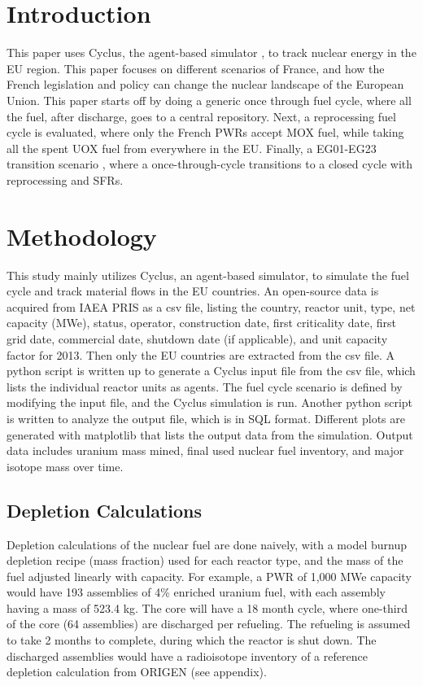 \section{Introduction}
This paper uses Cyclus, the agent-based simulator \cite{huff_fundamental_2016}, to track
nuclear energy in the EU region. This paper focuses on different scenarios of France,
and how the French legislation and policy can change the nuclear landscape of the European
Union. This paper starts off by doing a generic once through fuel cycle, where all the fuel,
after discharge, goes to a central repository. Next, a reprocessing fuel cycle is evaluated,
where only the French \gls{PWR}s accept \gls{MOX} fuel, while taking all the spent \gls{UOX}
fuel from everywhere in the EU. Finally, a EG01-EG23 transition scenario \cite{wigeland_nuclear_2014},
where a once-through-cycle transitions to a closed cycle with reprocessing and \gls{SFR}s. 

\section{Methodology}
This study mainly utilizes Cyclus, an agent-based simulator, to simulate the fuel cycle
and track material flows in the EU countries. An open-source data is acquired from \gls{IAEA}
\gls{PRIS} as a csv file, listing the country, reactor unit, type, net capacity (MWe), status,
operator, construction date, first criticality date, first grid date, commercial date, shutdown
date (if applicable), and unit capacity factor for 2013. Then only the EU countries are extracted
from the csv file. A python script is written up to generate a Cyclus input file from the csv file,
which lists the individual reactor units as agents. The fuel cycle scenario is defined by modifying
the input file, and the Cyclus simulation is run. Another python script is written to analyze the 
output file, which is in SQL format. Different plots are generated with matplotlib that lists the 
output data from the simulation. Output data includes uranium mass mined, final used nuclear fuel
inventory, and major isotope mass over time.


\subsection{Depletion Calculations}
Depletion calculations of the nuclear fuel are done
naively, with a model burnup depletion recipe (mass fraction) used
for each reactor type, and the mass of the fuel 
adjusted linearly with capacity. For example, a PWR of
1,000 MWe capacity would have 193 assemblies of 4\% enriched
uranium fuel, with each assembly having a mass of 523.4 kg.
The core will have a 18 month cycle, where one-third of the 
core (64 assemblies) are discharged per refueling. The refueling
is assumed to take 2 months to complete, during which the reactor
is shut down. The discharged
assemblies would have a radioisotope inventory of a reference
depletion calculation from ORIGEN (see appendix).


